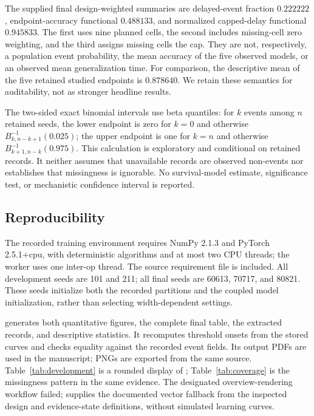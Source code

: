 \documentclass{article}
\begin{document}
The supplied final design-weighted summaries are delayed-event fraction $0.222222$, endpoint-accuracy functional $0.488133$, and normalized capped-delay functional $0.945833$. The first uses nine planned cells, the second includes missing-cell zero weighting, and the third assigns missing cells the cap. They are not, respectively, a population event probability, the mean accuracy of the five observed models, or an observed mean generalization time. For comparison, the descriptive mean of the five retained studied endpoints is $0.878640$. We retain these semantics for auditability, not as stronger headline results.

The two-sided exact binomial intervals use beta quantiles: for $k$ events among $n$ retained seeds, the lower endpoint is zero for $k=0$ and otherwise $B^{-1}_{k,n-k+1}(0.025)$; the upper endpoint is one for $k=n$ and otherwise $B^{-1}_{k+1,n-k}(0.975)$. This calculation is exploratory and conditional on retained records. It neither assumes that unavailable records are observed non-events nor establishes that missingness is ignorable. No survival-model estimate, significance test, or mechanistic confidence interval is reported.

\subsection{Reproducibility}
The recorded training environment requires NumPy 2.1.3 and PyTorch 2.5.1+cpu, with deterministic algorithms and at most two CPU threads; the worker uses one inter-op thread. The source requirement file is included. All development seeds are 101 and 211; all final seeds are 60613, 70717, and 80821. These seeds initialize both the recorded partitions and the coupled model initialization, rather than selecting width-dependent settings.

 generates both quantitative figures, the complete final table, the extracted records, and descriptive statistics. It recomputes threshold onsets from the stored curves and checks equality against the recorded event fields. Its output PDFs are used in the manuscript; PNGs are exported from the same source. Table~\ref{tab:development} is a rounded display of ; Table~\ref{tab:coverage} is the missingness pattern in the same evidence. The designated overview-rendering workflow failed;  supplies the documented vector fallback from the inspected design and evidence-state definitions, without simulated learning curves.
\end{document}
